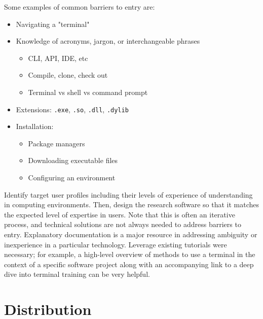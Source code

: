 \documentclass[]{nrel}
\begin{document}
Some examples of common barriers to entry are:
\begin{itemize}
\item Navigating a "terminal"

\item Knowledge of acronyms, jargon, or interchangeable phrases
\begin{itemize}
\item CLI, API, IDE, etc

\item Compile, clone, check out

\item Terminal vs shell vs command prompt

\end{itemize}

\item Extensions: \lstinline{.exe}, \lstinline{.so}, \lstinline{.dll}, \lstinline{.dylib}

\item Installation:
\begin{itemize}
\item Package managers

\item Downloading executable files

\item Configuring an environment

\end{itemize}

\end{itemize}

Identify target user profiles including their levels of experience of understanding in
computing environments.
Then, design the research software so that it matches the expected level of expertise in
users.
Note that this is often an iterative process, and technical solutions are not always needed
to address barriers to entry.
Explanatory documentation is a major resource in addressing ambiguity or inexperience in
a particular technology.
Leverage existing tutorials were necessary; for example, a high-level overview of methods
to use a terminal in the context of a specific software project along with an accompanying
link to a deep dive into terminal training can be very helpful.

\section{Distribution}
\end{document}
